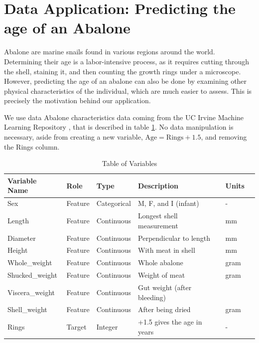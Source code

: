 \documentclass[a4paper,11pt]{article}
\begin{document}
\section{Data Application: Predicting the age of an Abalone}

Abalone are marine snails found in various regions around the world. Determining their age is a labor-intensive process, as it requires cutting through the shell, staining it, and then counting the growth rings under a microscope. However, predicting the age of an abalone can also be done by examining other physical characteristics of the individual, which are much easier to assess. This is precisely the motivation behind our application.

We use data Abalone characteristics data coming from the UC Irvine Machine Learning Repository \parencite{warwicknashAbalone1994a}, that is described in table \ref{table1}. No data manipulation is necessary, aside from creating a new variable, \( \text{Age} = \text{Rings} + 1.5 \), and removing the Rings column.

\begin{table}[]
  \centering
  \begin{tabular}{llllll}

  \toprule
  Variable Name & Role & Type & Description & Units \\
  \midrule
  Sex                  & Feature       & Categorical   & M, F, and I (infant) & -    \\
  Length               & Feature       & Continuous    & Longest shell measurement & mm\\
  Diameter             & Feature       & Continuous    & Perpendicular to length & mm  \\
  Height               & Feature       & Continuous    & With meat in shell      & mm  \\
  Whole\_weight         & Feature       & Continuous    & Whole abalone           & gram\\
  Shucked\_weight       & Feature       & Continuous    & Weight of meat          & gram\\
  Viscera\_weight       & Feature       & Continuous    & Gut weight (after bleeding) & \\
  Shell\_weight         & Feature       & Continuous    & After being dried       & gram\\
  Rings                & Target        & Integer       & +1.5 gives the age in years & - \\

   \bottomrule
  \end{tabular}
  \caption{Table of Variables}
  \label{table1}
  \end{table}
\end{document}
